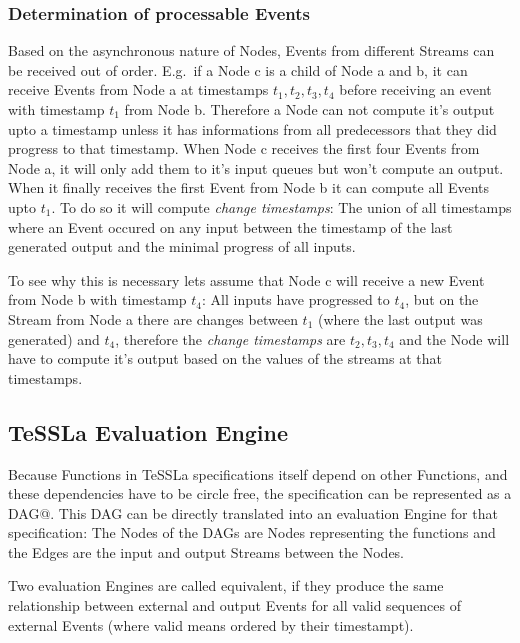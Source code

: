 \subsubsection{Determination of processable Events}
\label{sec:concepts:defs:nodes:processable}

Based on the asynchronous nature of Nodes, Events from different Streams can be received out of order.
E.g.\ if a Node c is a child of Node a and b, it can receive Events from Node a at timestamps \(t_1, t_2, t_3, t_4\)
before receiving an event with timestamp \(t_1\) from Node b.
Therefore a Node can not compute it's output upto a timestamp unless it has informations from all predecessors that they did progress to that timestamp.
When Node c receives the first four Events from Node a, it will only add them to it's input queues but won't compute an output.
When it finally receives the first Event from Node b it can compute all Events upto \(t_1\).
To do so it will compute \emph{change timestamps}: The union of all timestamps where an Event occured on any input between the timestamp of the last generated output and the minimal progress of all inputs.

To see why this is necessary lets assume that Node c will receive a new Event from Node b with timestamp \(t_4\):
All inputs have progressed to \(t_4\), but on the Stream from Node a there are changes between \(t_1\) (where the last output was generated) and \(t_4\),
therefore the \emph{change timestamps} are \(t_2, t_3, t_4\) and the Node will have to compute it's output based on the values of the streams at that timestamps.

\subsection{TeSSLa Evaluation Engine}
\label{sec:concepts:def:eval_engine}

Because Functions in TeSSLa specifications itself depend on other Functions, and these dependencies have to be circle free,
the specification can be represented as a DAG@.
This DAG can be directly translated into an evaluation Engine for that specification: The Nodes of the DAGs are Nodes representing the functions and the Edges are the input and output Streams between the Nodes.


\begin{definition}[name=Equivalence of evaluation Engines]\label{def:equivalence_eval_engine}
  Two evaluation Engines are called equivalent, if they produce the same relationship between external and output Events for all valid sequences of external Events (where valid means ordered by their timestampt).
\end{definition}

